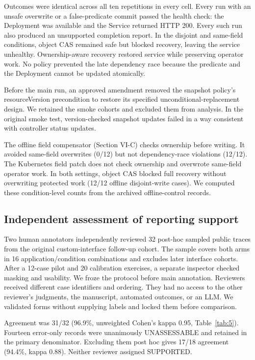 \documentclass[conference,10pt]{IEEEtran}
\begin{document}
Outcomes were identical across all ten repetitions in every cell. Every run with an unsafe overwrite or a false-predicate commit passed the health check: the Deployment was available and the Service returned HTTP 200. Every such run also produced an unsupported completion report. In the disjoint and same-field conditions, object CAS remained safe but blocked recovery, leaving the service unhealthy. Ownership-aware recovery restored service while preserving operator work. No policy prevented the late dependency race because the predicate and the Deployment cannot be updated atomically.

Before the main run, an approved amendment removed the snapshot policy's resourceVersion precondition to restore its specified unconditional-replacement design. We retained the smoke cohorts and excluded them from analysis. In the original smoke test, version-checked snapshot updates failed in a way consistent with controller status updates.

The offline field compensator (Section VI-C) checks ownership before writing. It avoided same-field overwrites (0/12) but not dependency-race violations (12/12). The Kubernetes field patch does not check ownership and overwrote same-field operator work. In both settings, object CAS blocked full recovery without overwriting protected work (12/12 offline disjoint-write cases). We computed these condition-level counts from the archived offline-control records.

\subsection{Independent assessment of reporting support}

Two human annotators independently reviewed 32 post-hoc sampled public traces from the original custom-interface follow-up cohort. The sample covers both arms in 16 application/condition combinations and excludes later interface cohorts. After a 12-case pilot and 20 calibration exercises, a separate inspector checked masking and usability. We froze the protocol before main annotation. Reviewers received different case identifiers and ordering. They had no access to the other reviewer's judgments, the manuscript, automated outcomes, or an LLM. We validated forms without supplying labels and locked them before comparison.

Agreement was 31/32 (96.9\%, unweighted Cohen's kappa 0.95, Table~\ref{tab:5}). Fourteen error-only records were unanimously UNASSESSABLE and retained in the primary denominator. Excluding them post hoc gives 17/18 agreement (94.4\%, kappa 0.88). Neither reviewer assigned SUPPORTED.
\end{document}
